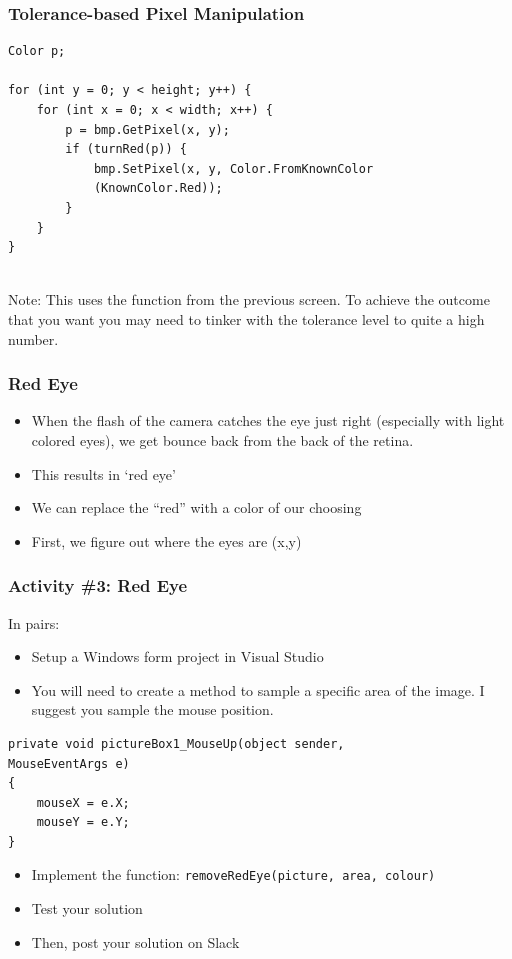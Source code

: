 \begin{frame}[fragile]
	\frametitle{Tolerance-based Pixel Manipulation}
	
	\begin{lstlisting}
Color p;

for (int y = 0; y < height; y++) {
	for (int x = 0; x < width; x++) {
		p = bmp.GetPixel(x, y);
		if (turnRed(p))	{
			bmp.SetPixel(x, y, Color.FromKnownColor
			(KnownColor.Red));
		}
	}
}
		
	\end{lstlisting}
Note: This uses the function from the previous screen. To achieve the outcome that you want you may need to tinker with the tolerance level to quite a high number.	
	
\end{frame}
		

\begin{frame}
	\frametitle{Red Eye}
	
	\begin{itemize}		
		\item When the flash of the camera catches the eye just right (especially with light colored eyes), we get bounce back from the back of the retina.
		\item This results in `red eye'
		\item We can replace the “red” with a color of our choosing
		\item First, we figure out where the eyes are (x,y)
	\end{itemize}
\end{frame}


\begin{frame}[fragile]
	\frametitle{Activity \#3: Red Eye}
	
	In pairs:
	
	\vspace{1em}
	
	\begin{itemize}		
		\item Setup a Windows form project in Visual Studio
		\item You will need to create a method to sample a specific area of the image. I suggest you sample the mouse position.
		\end{itemize}
	\begin{lstlisting}
private void pictureBox1_MouseUp(object sender,
MouseEventArgs e)
{
	mouseX = e.X;
	mouseY = e.Y;
}
\end{lstlisting}
	\begin{itemize}	
		\item Implement the function: \texttt{removeRedEye(picture, area, colour)}
		\item Test your solution
		\item Then, post your solution on Slack
	\end{itemize}


\end{frame}


